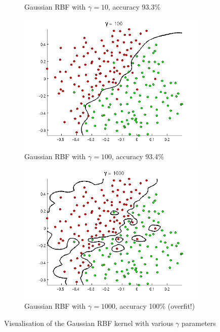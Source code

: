 \begin{figure}[H]
\begin{subfigure}{.5\textwidth}
  \caption{Gaussian RBF with $\gamma = 10$, accuracy 93.3\%}
  \label{fig:rbf2}
\end{subfigure}
\newline
\begin{subfigure}{.5\textwidth}
  \centering
  \includegraphics[width=.95\linewidth]{img/rbf3.png}
  \caption{Gaussian RBF with $\gamma = 100$, accuracy 93.4\%}
  \label{fig:rbf3}
\end{subfigure}%
\begin{subfigure}{.5\textwidth}
  \centering
  \includegraphics[width=.95\linewidth]{img/rbf4.png}
  \caption{Gaussian RBF with $\gamma = 1000$, accuracy 100\% (overfit!)}
  \label{fig:rbf4}
\end{subfigure}
\caption{Visualisation of the Gaussian RBF kernel with various $\gamma$ parameters}
\label{fig:rbf}
\end{figure}

